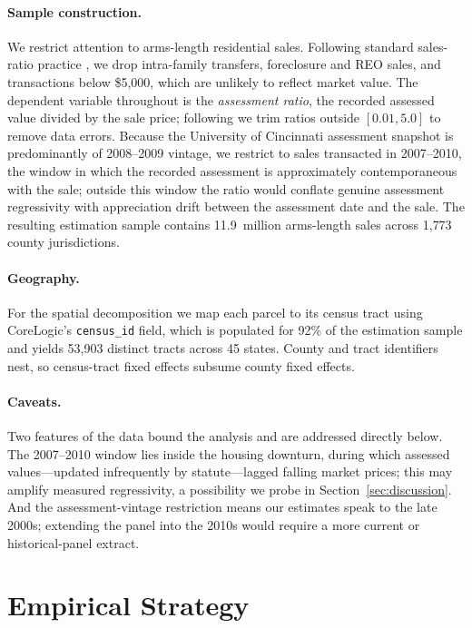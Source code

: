 \documentclass[12pt, letterpaper]{article}
\begin{document}
\paragraph{Sample construction.} We restrict attention to arms-length residential sales. Following standard sales-ratio practice \citep{iaao2013ratio}, we drop intra-family transfers, foreclosure and REO sales, and transactions below \$5{,}000, which are unlikely to reflect market value. The dependent variable throughout is the \emph{assessment ratio}, the recorded assessed value divided by the sale price; following \citet{berry2021reassessing} we trim ratios outside $[0.01, 5.0]$ to remove data errors. Because the University of Cincinnati assessment snapshot is predominantly of 2008--2009 vintage, we restrict to sales transacted in 2007--2010, the window in which the recorded assessment is approximately contemporaneous with the sale; outside this window the ratio would conflate genuine assessment regressivity with appreciation drift between the assessment date and the sale. The resulting estimation sample contains 11.9~million arms-length sales across 1{,}773 county jurisdictions.

\paragraph{Geography.} For the spatial decomposition we map each parcel to its census tract using CoreLogic's \texttt{census\_id} field, which is populated for 92\% of the estimation sample and yields 53{,}903 distinct tracts across 45 states. County and tract identifiers nest, so census-tract fixed effects subsume county fixed effects.

\paragraph{Caveats.} Two features of the data bound the analysis and are addressed directly below. The 2007--2010 window lies inside the housing downturn, during which assessed values---updated infrequently by statute---lagged falling market prices; this may amplify measured regressivity, a possibility we probe in Section~\ref{sec:discussion}. And the assessment-vintage restriction means our estimates speak to the late 2000s; extending the panel into the 2010s would require a more current or historical-panel extract.

\section{Empirical Strategy}\label{sec:strategy}
\end{document}
